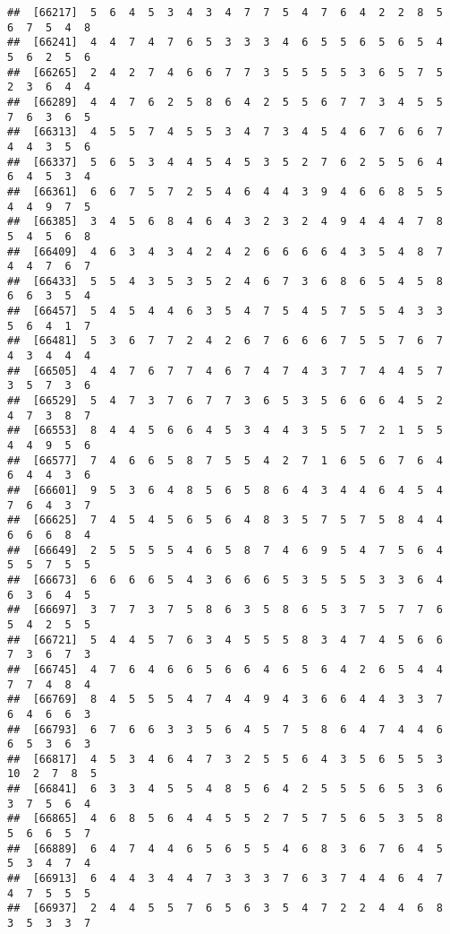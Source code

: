 \documentclass[
]{book}
\begin{document}
\begin{verbatim}
##  [66217]  5  6  4  5  3  4  3  4  7  7  5  4  7  6  4  2  2  8  5  6  7  5  4  8
##  [66241]  4  4  7  4  7  6  5  3  3  3  4  6  5  5  6  5  6  5  4  5  6  2  5  6
##  [66265]  2  4  2  7  4  6  6  7  7  3  5  5  5  5  3  6  5  7  5  2  3  6  4  4
##  [66289]  4  4  7  6  2  5  8  6  4  2  5  5  6  7  7  3  4  5  5  7  6  3  6  5
##  [66313]  4  5  5  7  4  5  5  3  4  7  3  4  5  4  6  7  6  6  7  4  4  3  5  6
##  [66337]  5  6  5  3  4  4  5  4  5  3  5  2  7  6  2  5  5  6  4  6  4  5  3  4
##  [66361]  6  6  7  5  7  2  5  4  6  4  4  3  9  4  6  6  8  5  5  4  4  9  7  5
##  [66385]  3  4  5  6  8  4  6  4  3  2  3  2  4  9  4  4  4  7  8  5  4  5  6  8
##  [66409]  4  6  3  4  3  4  2  4  2  6  6  6  6  4  3  5  4  8  7  4  4  7  6  7
##  [66433]  5  5  4  3  5  3  5  2  4  6  7  3  6  8  6  5  4  5  8  6  6  3  5  4
##  [66457]  5  4  5  4  4  6  3  5  4  7  5  4  5  7  5  5  4  3  3  5  6  4  1  7
##  [66481]  5  3  6  7  7  2  4  2  6  7  6  6  6  7  5  5  7  6  7  4  3  4  4  4
##  [66505]  4  4  7  6  7  7  4  6  7  4  7  4  3  7  7  4  4  5  7  3  5  7  3  6
##  [66529]  5  4  7  3  7  6  7  7  3  6  5  3  5  6  6  6  4  5  2  4  7  3  8  7
##  [66553]  8  4  4  5  6  6  4  5  3  4  4  3  5  5  7  2  1  5  5  4  4  9  5  6
##  [66577]  7  4  6  6  5  8  7  5  5  4  2  7  1  6  5  6  7  6  4  6  4  4  3  6
##  [66601]  9  5  3  6  4  8  5  6  5  8  6  4  3  4  4  6  4  5  4  7  6  4  3  7
##  [66625]  7  4  5  4  5  6  5  6  4  8  3  5  7  5  7  5  8  4  4  6  6  6  8  4
##  [66649]  2  5  5  5  5  4  6  5  8  7  4  6  9  5  4  7  5  6  4  5  5  7  5  5
##  [66673]  6  6  6  6  5  4  3  6  6  6  5  3  5  5  5  3  3  6  4  6  3  6  4  5
##  [66697]  3  7  7  3  7  5  8  6  3  5  8  6  5  3  7  5  7  7  6  5  4  2  5  5
##  [66721]  5  4  4  5  7  6  3  4  5  5  5  8  3  4  7  4  5  6  6  7  3  6  7  3
##  [66745]  4  7  6  4  6  6  5  6  6  4  6  5  6  4  2  6  5  4  4  7  7  4  8  4
##  [66769]  8  4  5  5  5  4  7  4  4  9  4  3  6  6  4  4  3  3  7  6  4  6  6  3
##  [66793]  6  7  6  6  3  3  5  6  4  5  7  5  8  6  4  7  4  4  6  6  5  3  6  3
##  [66817]  4  5  3  4  6  4  7  3  2  5  5  6  4  3  5  6  5  5  3 10  2  7  8  5
##  [66841]  6  3  3  4  5  5  4  8  5  6  4  2  5  5  5  6  5  3  6  3  7  5  6  4
##  [66865]  4  6  8  5  6  4  4  5  5  2  7  5  7  5  6  5  3  5  8  5  6  6  5  7
##  [66889]  6  4  7  4  4  6  5  6  5  5  4  6  8  3  6  7  6  4  5  5  3  4  7  4
##  [66913]  6  4  4  3  4  4  7  3  3  3  7  6  3  7  4  4  6  4  7  4  7  5  5  5
##  [66937]  2  4  4  5  5  7  6  5  6  3  5  4  7  2  2  4  4  6  8  3  5  3  3  7

\end{verbatim}
\end{document}
